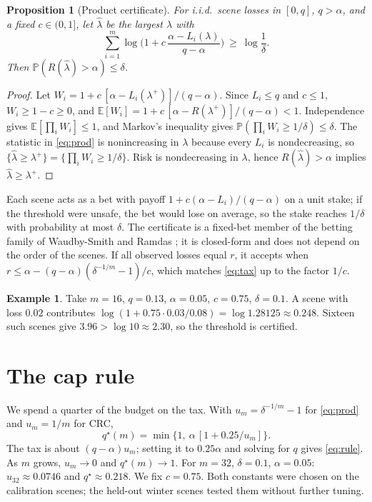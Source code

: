 \documentclass[11pt,a4paper]{article}
\newtheorem{proposition}{Proposition}
\theoremstyle{definition}
\newtheorem{example}{Example}
\theoremstyle{remark}
\newcommand{\E}{\mathbb{E}}
\newcommand{\Prob}{\mathbb{P}}
\newcommand{\1}{\mathbf{1}}
\begin{document}
\begin{proposition}[Product certificate]\label{prop:product}
For i.i.d.\ scene losses in $[0,q]$, $q>\alpha$, and a fixed $c\in(0,1]$, let $\hat\lambda$ be the largest $\lambda$ with
\begin{equation}
\sum_{i=1}^{m}\log\Big(1+c\,\frac{\alpha-L_i(\lambda)}{q-\alpha}\Big)\ \ge\ \log\frac1\delta.
\label{eq:prod}
\end{equation}
Then $\Prob(R(\hat\lambda)>\alpha)\le\delta$.
\end{proposition}

\begin{proof}
Let $W_i=1+c\,[\alpha-L_i(\lambda^{+})]/(q-\alpha)$. Since $L_i\le q$ and $c\le1$, $W_i\ge1-c\ge0$, and $\E[W_i]=1+c\,[\alpha-R(\lambda^{+})]/(q-\alpha)<1$. Independence gives $\E[\prod_iW_i]\le1$, and Markov's inequality gives $\Prob(\prod_iW_i\ge1/\delta)\le\delta$. The statistic in \eqref{eq:prod} is nonincreasing in $\lambda$ because every $L_i$ is nondecreasing, so $\{\hat\lambda\ge\lambda^{+}\}=\{\prod_iW_i\ge1/\delta\}$. Risk is nondecreasing in $\lambda$, hence $R(\hat\lambda)>\alpha$ implies $\hat\lambda\ge\lambda^{+}$.
\end{proof}

Each scene acts as a bet with payoff $1+c(\alpha-L_i)/(q-\alpha)$ on a unit stake; if the threshold were unsafe, the bet would lose on average, so the stake reaches $1/\delta$ with probability at most $\delta$. The certificate is a fixed-bet member of the betting family of Waudby-Smith and Ramdas \cite{wsr}; it is closed-form and does not depend on the order of the scenes. If all observed losses equal $r$, it accepts when $r\le\alpha-(q-\alpha)(\delta^{-1/m}-1)/c$, which matches \eqref{eq:tax} up to the factor $1/c$.

\begin{example}
Take $m=16$, $q=0.13$, $\alpha=0.05$, $c=0.75$, $\delta=0.1$. A scene with loss $0.02$ contributes $\log(1+0.75\cdot0.03/0.08)=\log1.28125\approx0.248$. Sixteen such scenes give $3.96>\log10\approx2.30$, so the threshold is certified.
\end{example}

\section{The cap rule}

We spend a quarter of the budget on the tax. With $u_m=\delta^{-1/m}-1$ for \eqref{eq:prod} and $u_m=1/m$ for CRC,
\begin{equation}
q^\star(m)=\min\bigl\{1,\ \alpha\,[1+0.25/u_m]\bigr\}.
\label{eq:rule}
\end{equation}
The tax is about $(q-\alpha)u_m$; setting it to $0.25\alpha$ and solving for $q$ gives \eqref{eq:rule}. As $m$ grows, $u_m\to0$ and $q^\star(m)\to1$. For $m=32$, $\delta=0.1$, $\alpha=0.05$: $u_{32}\approx0.0746$ and $q^\star\approx0.218$. We fix $c=0.75$. Both constants were chosen on the calibration scenes; the held-out winter scenes tested them without further tuning.
\end{document}
